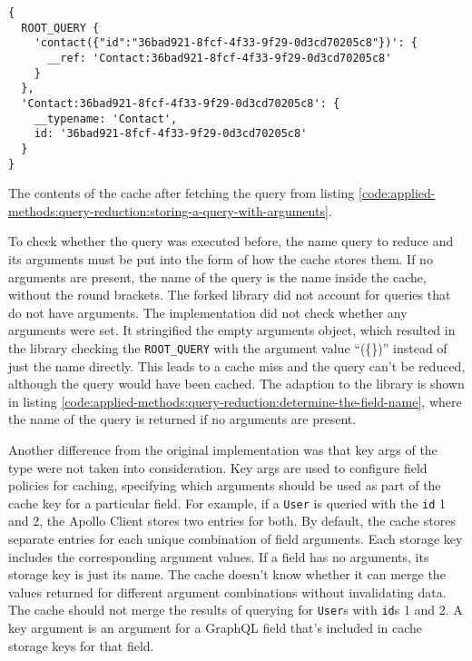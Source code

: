 \ifshowListings
\begin{listing}[H]
\begin{verbatim}
{
  ROOT_QUERY {
    'contact({"id":"36bad921-8fcf-4f33-9f29-0d3cd70205c8"})': {
      __ref: 'Contact:36bad921-8fcf-4f33-9f29-0d3cd70205c8'
    }
  },
  'Contact:36bad921-8fcf-4f33-9f29-0d3cd70205c8': {
    __typename: 'Contact',
    id: '36bad921-8fcf-4f33-9f29-0d3cd70205c8'
  }
}
\end{verbatim}
\caption{The contents of the cache after fetching the query from listing \ref{code:applied-methods:query-reduction:storing-a-query-with-arguments}.}\label{code:applied-methods:query-reduction:cache-representation-of-query-with-arguments}
\end{listing}
\fi

\noindent To check whether the query was executed before, the name query to reduce and its arguments must be put into the form of how the cache stores them. If no arguments are present, the name of the query is the name inside the cache, without the round brackets. The forked library did not account for queries that do not have arguments. The implementation did not check whether any arguments were set. It stringified the empty arguments object, which resulted in the library checking the \texttt{ROOT\_QUERY} with the argument value \enquote{(\{\})} instead of just the name directly. This leads to a cache miss and the query can't be reduced, although the query would have been cached. The adaption to the library is shown in listing \ref{code:applied-methods:query-reduction:determine-the-field-name}, where the name of the query is returned if no arguments are present.

\bigskip

\noindent Another difference from the original implementation was that key args of the type were not taken into consideration. Key args are used to configure field policies for caching, specifying which arguments should be used as part of the cache key for a particular field.  For example, if a \texttt{User} is queried with the \texttt{id} 1 and 2, the Apollo Client stores two entries for both. By default, the cache stores separate entries for each unique combination of field arguments. Each storage key includes the corresponding argument values. If a field has no arguments, its storage key is just its name. The cache doesn't know whether it can merge the values returned for different argument combinations without invalidating data. The cache should not merge the results of querying for \texttt{User}s with \texttt{id}s 1 and 2. A key argument is an argument for a GraphQL field that's included in cache storage keys for that field. \cite{misc:-:applied-methods:query-reduction:key-args}

